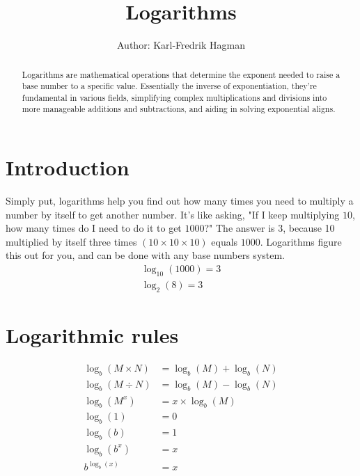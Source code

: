 \documentclass{article}
\begin{document}
\title{Logarithms}
\author{Author: Karl-Fredrik Hagman}
\date{}
\maketitle

\begin{abstract}
    Logarithms are mathematical operations that determine the exponent needed to raise a base number to a specific value. Essentially the inverse of exponentiation, they're fundamental in various fields, simplifying complex multiplications and divisions into more manageable additions and subtractions, and aiding in solving exponential aligns.
\end{abstract}

\section{Introduction}
    Simply put, logarithms help you find out how many times you need to multiply a number by itself to get another number. It's like asking, "If I keep multiplying $10$, how many times do I need to do it to get $1000$?" The answer is $3$, because 10 multiplied by itself three times $(10 \times 10 \times 10)$ equals $1000$. Logarithms figure this out for you, and can be done with any base numbers system.
\begin{align}
    \log_{10}(1000) = 3 \\
    \log_{2}(8) = 3
\end{align}

\section{Logarithmic rules}
\begin{align}
    \log_{b}(M\times N) &= \log_{b}(M) + \log_{b}(N) \\
    \log_{b}(M\div N) &= \log_{b}(M) - \log_{b}(N) \\
    \log_{b}(M^x) &= x \times \log_{b}(M) \\
    \log_{b}(1) &= 0 \\
    \log_{b}(b) &= 1 \\
    \log_{b}(b^x) &= x \\
    b^{\log_{b}(x)} &= x
\end{align}
\end{document}
